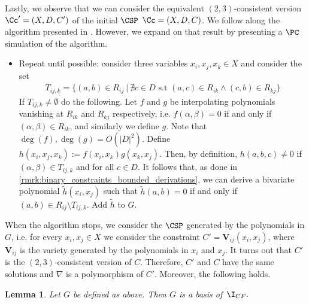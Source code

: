 \documentclass[11pt]{article}
\newtheorem{lemma}[theorem]{Lemma}
\begin{document}
Lastly, we observe that we can consider the equivalent $(2,3)$-consistent version $\Cc' = (X, D, C')$ of the initial $\CSP$ $\Cc = (X, D, C)$. We follow along the algorithm presented in \cite{BulatovRSTOC22}. However, we expand on that result by presenting a $\PC$ simulation of the algorithm.
\begin{itemize}
    \item Repeat until possible: consider three variables $x_i, x_j, x_k \in X$ and consider the set
    \begin{align*}
        T_{ij,k} = \{(a,b) \in R_{ij} \ | \ \nexists c \in D \text{ s.t } (a,c) \in R_{ik} \wedge (c,b) \in R_{kj} \} 
    \end{align*}
    If $T_{ij,k} \neq \emptyset$ do the following. Let $f$ and $g$ be interpolating polynomials vanishing at $R_{ik}$ and $R_{kj}$ respectively, i.e. $f(\alpha, \beta) = 0$ if and only if $(\alpha, \beta) \in R_{ik}$, and similarly we define $g$. Note that $\deg(f), \deg(g) = O(|D|^2)$. Define $h(x_i, x_j, x_k) := f(x_i, x_k)g(x_k, x_j)$. Then, by definition, $h(a,b,c) \neq 0$ if $(\alpha,\beta) \in T_{ij,k}$ and for all $c \in D$. It follows that, as done in \cref{rmrk:binary_constraints_bounded_derivations}, we can derive a bivariate polynomial $\tilde{h}(x_i,x_j)$ such that $\tilde{h}(a,b) = 0$ if and only if $(a,b) \in R_{ij} \setminus T_{ij,k}$. Add $\tilde{h}$ to $G$.
\end{itemize}
When the algorithm stops, we consider the $\CSP$ generated by the polynomials in $G$, i.e. for every $x_i, x_j \in X$ we consider the constraint $C' = \mathbf{V}_{ij}(x_i, x_j)$, where $\mathbf{V}_{ij}$ is the variety generated by the polynomials in $x_i$ and $x_j$. It turns out that $C'$ is the $(2,3)$-consistent version of $C$. Therefore, $C'$ and $C$ have the same solutions and $\nabla$ is a polymorphism of $C'$. Moreover, the following holds.

\begin{lemma}\cite[Lemma~4.1.5]{rafiey_constraint_2022}\label{th:complete_two-fan_grobner_basis}
    Let $G$ be defined as above. Then $G$ is a \GB basis of~$\I_{CF}.$
\end{lemma}


\end{document}
